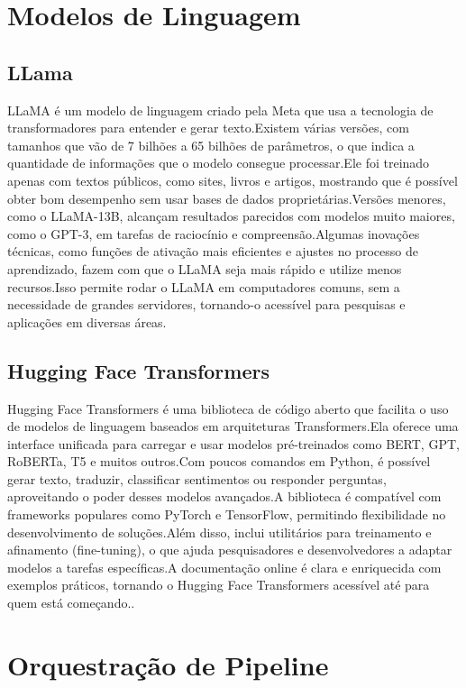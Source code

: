 \begin{description}
\section{Modelos de Linguagem}
\subsection{LLama}
LLaMA é um modelo de linguagem criado pela Meta que usa a tecnologia de transformadores para entender e gerar texto.Existem várias versões, com tamanhos que vão de 7 bilhões a 65 bilhões de parâmetros, o que indica a quantidade de informações que o modelo consegue processar.Ele foi treinado apenas com textos públicos, como sites, livros e artigos, mostrando que é possível obter bom desempenho sem usar bases de dados proprietárias.Versões menores, como o LLaMA-13B, alcançam resultados parecidos com modelos muito maiores, como o GPT-3, em tarefas de raciocínio e compreensão.Algumas inovações técnicas, como funções de ativação mais eficientes e ajustes no processo de aprendizado, fazem com que o LLaMA seja mais rápido e utilize menos recursos.Isso permite rodar o LLaMA em computadores comuns, sem a necessidade de grandes servidores, tornando-o acessível para pesquisas e aplicações em diversas áreas.
\cite{touvron2023llama}


\subsection{Hugging Face Transformers}
Hugging Face Transformers é uma biblioteca de código aberto que facilita o uso de modelos de linguagem baseados em arquiteturas Transformers.Ela oferece uma interface unificada para carregar e usar modelos pré-treinados como BERT, GPT, RoBERTa, T5 e muitos outros.Com poucos comandos em Python, é possível gerar texto, traduzir, classificar sentimentos ou responder perguntas, aproveitando o poder desses modelos avançados.A biblioteca é compatível com frameworks populares como PyTorch e TensorFlow, permitindo flexibilidade no desenvolvimento de soluções.Além disso, inclui utilitários para treinamento e afinamento (fine-tuning), o que ajuda pesquisadores e desenvolvedores a adaptar modelos a tarefas específicas.A documentação online é clara e enriquecida com exemplos práticos, tornando o Hugging Face Transformers acessível até para quem está começando.\cite{huggingface2024transformers}.

\section{Orquestração de Pipeline}

\end{description}
